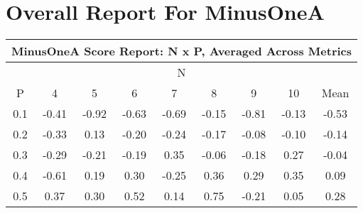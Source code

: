 \documentclass[11pt,a4paper]{report}
\begin{document}
\chapter{Overall Report For MinusOneA}
\begin{longtable}{ | c || c | c | c | c | c | c | c || c |}
\hline
\multicolumn{9}{|c|}{ MinusOneA Score Report: N x P, Averaged Across Metrics } \\
\hline
\multicolumn{9}{|c|}{ N } \\
\hline
P & 4 & 5 & 6 & 7 & 8 & 9 & 10 & Mean\\
\hline
\hline
\endhead
0.1 &  \cellcolor[HTML]{FFF7F7} -0.41 &  \cellcolor[HTML]{FFE7E7} -0.92 &  \cellcolor[HTML]{FFEFEF} -0.63 &  \cellcolor[HTML]{FFEFEF} -0.69 &  \cellcolor[HTML]{FFFFFF} -0.15 &  \cellcolor[HTML]{FFE7E7} -0.81 &  \cellcolor[HTML]{FFFFFF} -0.13 &  \cellcolor[HTML]{FFEFEF} -0.53 \\
0.2 &  \cellcolor[HTML]{FFF7F7} -0.33 &  \cellcolor[HTML]{FFFFFF} 0.13 &  \cellcolor[HTML]{FFF7F7} -0.20 &  \cellcolor[HTML]{FFF7F7} -0.24 &  \cellcolor[HTML]{FFF7F7} -0.17 &  \cellcolor[HTML]{FFFFFF} -0.08 &  \cellcolor[HTML]{FFFFFF} -0.10 &  \cellcolor[HTML]{FFFFFF} -0.14 \\
0.3 &  \cellcolor[HTML]{FFF7F7} -0.29 &  \cellcolor[HTML]{FFF7F7} -0.21 &  \cellcolor[HTML]{FFF7F7} -0.19 &  \cellcolor[HTML]{F7F7FF} 0.35 &  \cellcolor[HTML]{FFFFFF} -0.06 &  \cellcolor[HTML]{FFF7F7} -0.18 &  \cellcolor[HTML]{F7F7FF} 0.27 &  \cellcolor[HTML]{FFFFFF} -0.04 \\
0.4 &  \cellcolor[HTML]{FFEFEF} -0.61 &  \cellcolor[HTML]{F7F7FF} 0.19 &  \cellcolor[HTML]{F7F7FF} 0.30 &  \cellcolor[HTML]{FFF7F7} -0.25 &  \cellcolor[HTML]{F7F7FF} 0.36 &  \cellcolor[HTML]{F7F7FF} 0.29 &  \cellcolor[HTML]{F7F7FF} 0.35 &  \cellcolor[HTML]{FFFFFF} 0.09 \\
0.5 &  \cellcolor[HTML]{F7F7FF} 0.37 &  \cellcolor[HTML]{F7F7FF} 0.30 &  \cellcolor[HTML]{EFEFFF} 0.52 &  \cellcolor[HTML]{FFFFFF} 0.14 &  \cellcolor[HTML]{EFEFFF} 0.75 &  \cellcolor[HTML]{FFF7F7} -0.21 &  \cellcolor[HTML]{FFFFFF} 0.05 &  \cellcolor[HTML]{F7F7FF} 0.28 \\

\end{longtable}
\end{document}
